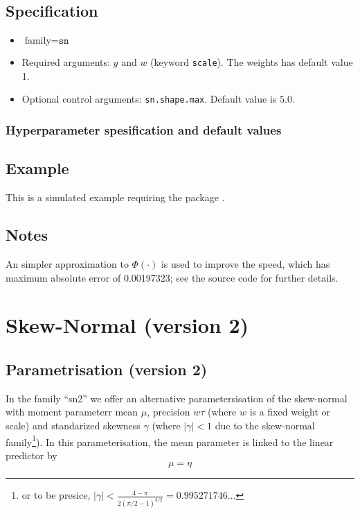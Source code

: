 \documentclass[a4paper,11pt]{article}
\begin{document}
\subsection*{Specification}

\begin{itemize}
\item $\text{family}=\texttt{sn}$
\item Required arguments: $y$ and $w$ (keyword \texttt{scale}). The
    weights has default value 1.
\item Optional control arguments: \texttt{sn.shape.max}. Default value is
    $5.0$.
\end{itemize}

\subsubsection*{Hyperparameter spesification and default values}




\subsection*{Example}

This is a simulated example requiring the package \verb@sn@.


\subsection*{Notes}

An simpler approximation to $\Phi(\cdot)$ is used to improve the
speed, which has maximum absolute error of 0.00197323; see the source
code for further details.

\clearpage


\section*{Skew-Normal (version 2)}

\subsection*{Parametrisation (version 2)}

In the family ``sn2'' we offer an alternative parametersisation of the
skew-normal with moment parameterr mean $\mu$, precision $w\tau$
(where $w$ is a fixed weight or scale) and standarized skewness
$\gamma$ (where $|\gamma|<1$
due to the skew-normal family\footnote{%
    or to be presice,
    $|\gamma| < \frac{4-\pi}{2\left(\pi/2-1\right)^{3/2}} =
    0.995271746\ldots$}). In this parameterisation, the mean
parameter is linked to the linear predictor by
\begin{displaymath}
    \mu = \eta
\end{displaymath}
\end{document}
